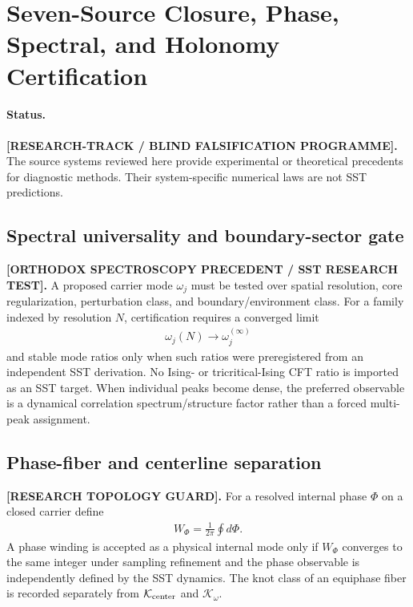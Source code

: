 
\section{Seven-Source Closure, Phase, Spectral, and Holonomy Certification}
\label{sec:rt_seven_source_certification}

\paragraph{Status.}
\textbf{[RESEARCH-TRACK / BLIND FALSIFICATION PROGRAMME].}
The source systems reviewed here provide experimental or theoretical
precedents for diagnostic methods.  Their system-specific numerical laws are
not SST predictions.

\subsection{Spectral universality and boundary-sector gate}
\textbf{[ORTHODOX SPECTROSCOPY PRECEDENT / SST RESEARCH TEST].}
A proposed carrier mode \(\omega_j\) must be tested over spatial resolution,
core regularization, perturbation class, and boundary/environment class.
For a family indexed by resolution \(N\), certification requires a converged
limit
\begin{align}
\omega_j(N)\longrightarrow\omega_j^{(\infty)}
\end{align}
and stable mode ratios only when such ratios were preregistered from an
independent SST derivation.  No Ising- or tricritical-Ising CFT ratio is
imported as an SST target.  When individual peaks become dense, the preferred
observable is a dynamical correlation spectrum/structure factor rather than a
forced multi-peak assignment.

\subsection{Phase-fiber and centerline separation}
\textbf{[RESEARCH TOPOLOGY GUARD].}
For a resolved internal phase \(\Phi\) on a closed carrier define
\begin{align}
W_\Phi
=\frac{1}{2\pi}\oint d\Phi.
\end{align}
A phase winding is accepted as a physical internal mode only if
\(W_\Phi\) converges to the same integer under sampling refinement and the
phase observable is independently defined by the SST dynamics.  The knot
class of an equiphase fiber is recorded separately from
\(\mathcal K_{\rm center}\) and \(\mathcal K_\omega\).

